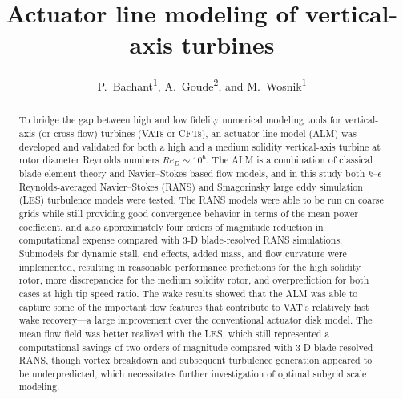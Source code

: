 \documentclass[times]{weauth}
\begin{document}


\title{Actuator line modeling of vertical-axis turbines}

\author{P.~Bachant\textsuperscript{1}, A.~Goude\textsuperscript{2}, and
M.~Wosnik\textsuperscript{1}}

\address{\textsuperscript{1}Center for Ocean Renewable Energy,
University of New Hampshire, 24
Colovos Rd., Durham, NH, 03824, USA \\
\textsuperscript{2}Department of Engineering Sciences,
Division of Electricity, Uppsala University, Uppsala 751 21, Sweden}


\linenumbers

\begin{abstract}
    To bridge the gap between high and low fidelity numerical modeling tools for
    vertical-axis (or cross-flow) turbines (VATs or CFTs), an actuator line
    model (ALM) was developed and validated for both a high and a medium
    solidity vertical-axis turbine at rotor diameter Reynolds numbers $Re_D \sim
    10^6$. The ALM is a combination of classical blade element theory and
    Navier--Stokes based flow models, and in this study both $k$--$\epsilon$
    Reynolds-averaged Navier--Stokes (RANS) and Smagorinsky large eddy
    simulation (LES) turbulence models were tested. The RANS models were able to
    be run on coarse grids while still providing good convergence behavior in
    terms of the mean power coefficient, and also approximately four orders of
    magnitude reduction in computational expense compared with 3-D
    blade-resolved RANS simulations. Submodels for dynamic stall, end effects,
    added mass, and flow curvature were implemented, resulting in reasonable
    performance predictions for the high solidity rotor, more discrepancies for
    the medium solidity rotor, and overprediction for both cases at high tip
    speed ratio. The wake results showed that the ALM was able to capture some
    of the important flow features that contribute to VAT's relatively fast wake
    recovery---a large improvement over the conventional actuator disk model.
    The mean flow field was better realized with the LES, which still
    represented a computational savings of two orders of magnitude compared with
    3-D blade-resolved RANS, though vortex breakdown and subsequent turbulence
    generation appeared to be underpredicted, which necessitates further
    investigation of optimal subgrid scale modeling.
\end{abstract}
\end{document}
